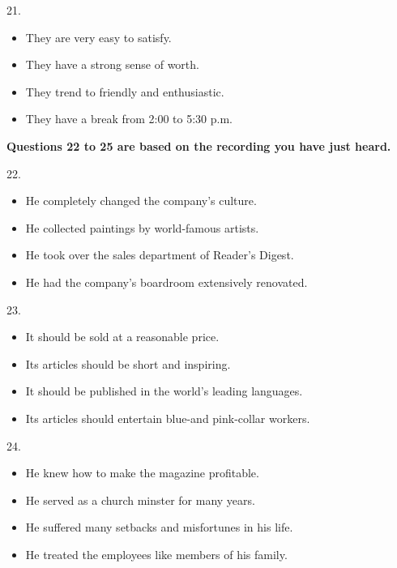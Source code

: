 \documentclass[UTF8,11pt]{ctexart}
\begin{document}
21.


\begin{itemize}[leftmargin=2em,itemsep=.2em,topsep=.4em]\item[A.] They are very easy to satisfy.
\item[B.] They have a strong sense of worth.
\item[C.] They trend to friendly and enthusiastic.
\item[D.] They have a break from 2:00 to 5:30 p.m.
\end{itemize}

\textbf{Questions 22 to 25 are based on the recording you have just heard.}


22.


\begin{itemize}[leftmargin=2em,itemsep=.2em,topsep=.4em]\item[A.] He completely changed the company's culture.
\item[B.] He collected paintings by world-famous artists.
\item[C.] He took over the sales department of Reader's Digest.
\item[D.] He had the company’s boardroom extensively renovated.
\end{itemize}

23.


\begin{itemize}[leftmargin=2em,itemsep=.2em,topsep=.4em]\item[A.] It should be sold at a reasonable price.
\item[B.] Its articles should be short and inspiring.
\item[C.] It should be published in the world's leading languages.
\item[D.] Its articles should entertain blue-and pink-collar workers.
\end{itemize}

24.


\begin{itemize}[leftmargin=2em,itemsep=.2em,topsep=.4em]\item[A.] He knew how to make the magazine profitable.
\item[B.] He served as a church minster for many years.
\item[C.] He suffered many setbacks and misfortunes in his life.
\item[D.] He treated the employees like members of his family.
\end{itemize}
\end{document}
